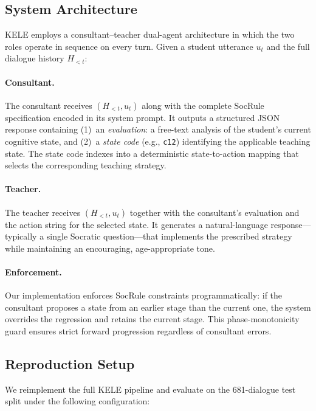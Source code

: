 \documentclass[11pt]{article}
\begin{document}
\subsection{System Architecture}

KELE employs a consultant--teacher dual-agent architecture in which the two roles operate in sequence on every turn. Given a student utterance $u_t$ and the full dialogue history $H_{<t}$:

\paragraph{Consultant.} The consultant receives $(H_{<t}, u_t)$ along with the complete SocRule specification encoded in its system prompt. It outputs a structured JSON response containing (1)~an \emph{evaluation}: a free-text analysis of the student's current cognitive state, and (2)~a \emph{state code} (e.g., \texttt{c12}) identifying the applicable teaching state. The state code indexes into a deterministic state-to-action mapping that selects the corresponding teaching strategy.

\paragraph{Teacher.} The teacher receives $(H_{<t}, u_t)$ together with the consultant's evaluation and the action string for the selected state. It generates a natural-language response---typically a single Socratic question---that implements the prescribed strategy while maintaining an encouraging, age-appropriate tone.

\paragraph{Enforcement.} Our implementation enforces SocRule constraints programmatically: if the consultant proposes a state from an earlier stage than the current one, the system overrides the regression and retains the current stage. This phase-monotonicity guard ensures strict forward progression regardless of consultant errors.

\subsection{Reproduction Setup}

We reimplement the full KELE pipeline and evaluate on the 681-dialogue test split under the following configuration:
\end{document}
